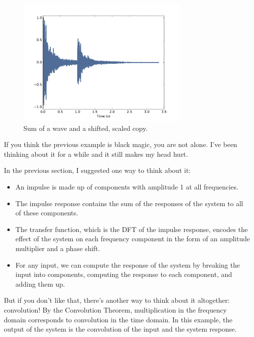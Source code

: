 \documentclass[12pt]{book}
\begin{document}
\begin{figure}
\centerline{\includegraphics[height=2.5in]{figs/systems8.pdf}}
\caption{Sum of a wave and a shifted, scaled copy.}
\label{fig.systems8}
\end{figure}

If you think the previous example is black magic,
you are not alone.  I've been thinking about it for a while and it
still makes my head hurt.

In the previous section, I suggested one way to think about it:

\begin{itemize}

\item An impulse is made up of components with amplitude 1 at all
  frequencies.

\item The impulse response contains the sum of the responses of the
  system to all of these components.

\item The transfer function, which is the DFT of the impulse response,
  encodes the effect of the system on each frequency component in the form
  of an amplitude multiplier and a phase shift.

\item For any input, we can compute the response of the system
  by breaking the input into components, computing the response to
  each component, and adding them up.

\end{itemize}

But if you don't like that, there's another way to think about
it altogether: convolution!  By the Convolution Theorem, multiplication
in the frequency domain corresponds to convolution in the time
domain.  In this example, the output of the system is the convolution
of the input and the system response.
\end{document}
